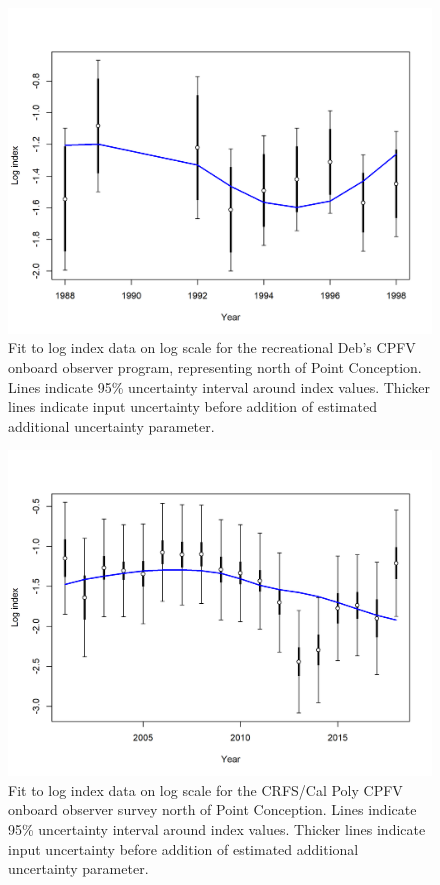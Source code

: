 \documentclass[12pt,]{article}
\begin{document}
\FloatBarrier

\begin{figure}
\centering
\includegraphics{r4ss/plots_mod1/index5_logcpuefit_DebCPFV.png}
\caption{Fit to log index data on log scale for the recreational Deb's
CPFV onboard observer program, representing north of Point Conception.
Lines indicate 95\% uncertainty interval around index values. Thicker
lines indicate input uncertainty before addition of estimated additional
uncertainty parameter. \label{fig:index5_logcpuefit_DebCPFV}}
\end{figure}

\FloatBarrier 

\begin{figure}
\centering
\includegraphics{r4ss/plots_mod1/index5_logcpuefit_RecOnboardNorth.png}
\caption{Fit to log index data on log scale for the CRFS/Cal Poly CPFV
onboard observer survey north of Point Conception. Lines indicate 95\%
uncertainty interval around index values. Thicker lines indicate input
uncertainty before addition of estimated additional uncertainty
parameter. \label{fig:index5_logcpuefit_RecOnboardNorth}}
\end{figure}
\end{document}
